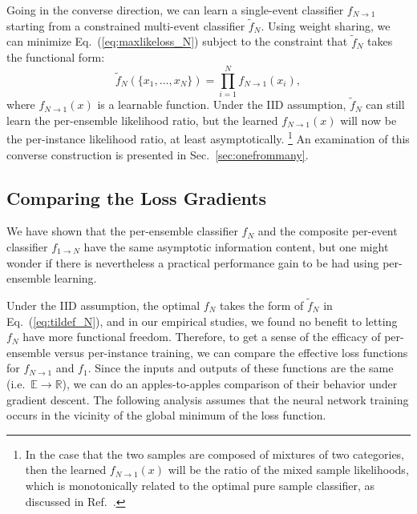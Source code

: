 \documentclass[aps,prx,reprint,preprintnumbers,superscriptaddress,nofootinbib,longbibliography,floatfix]{revtex4-2}
\DeclareRobustCommand{\Sec}[1]{Sec.~\ref{sec:#1}}
\DeclareRobustCommand{\Eq}[1]{Eq.~(\ref{eq:#1})}
\DeclareRobustCommand{\Ref}[1]{Ref.~\cite{#1}}
\begin{document}
Going in the converse direction, we can learn a single-event classifier $f_{N \to 1}$ starting from a constrained multi-event classifier $\tilde{f}_N$.
%
Using weight sharing, we can minimize \Eq{maxlikeloss_N} subject to the constraint that $\tilde{f}_N$ takes the functional form:
%
\begin{equation}
\label{eq:tildef_N}
\tilde{f}_N(\{x_1, \dots, x_N\}) = \prod_{i = 1}^N f_{N \to 1}(x_i),
\end{equation}
%
where $f_{N \to 1}(x)$ is a learnable function.
%
Under the IID assumption, $\tilde{f}_N$ can still learn the per-ensemble likelihood ratio, but the learned $f_{N \to 1}(x)$ will now be the per-instance likelihood ratio, at least asymptotically.%
%
\footnote{In the case that the two samples are composed of mixtures of two categories, then the learned $f_{N \to 1}(x)$ will be the ratio of the mixed sample likelihoods, which is monotonically related to the optimal pure sample classifier, as discussed in \Ref{Metodiev:2017vrx}.}
%
An examination of this converse construction is presented in \Sec{onefrommany}.


\subsection{Comparing the Loss Gradients}
\label{sec:gradients}

We have shown that the per-ensemble classifier $f_N$ and the composite per-event classifier $f_{1 \to N}$ have the same asymptotic information content, but one might wonder if there is nevertheless a practical performance gain to be had using per-ensemble learning.

Under the IID assumption, the optimal $f_N$ takes the form of $\tilde{f}_N$ in \Eq{tildef_N}, and in our empirical studies, we found no benefit to letting $f_N$ have more functional freedom.
%
Therefore, to get a sense of the efficacy of per-ensemble versus per-instance training, we can compare the effective loss functions for $f_{N \to 1}$ and $f_1$.
%
Since the inputs and outputs of these functions are the same (i.e.\ $\mathbb{E} \to \mathbb{R}$), we can do an apples-to-apples comparison of their behavior under gradient descent.
%
The following analysis assumes that the neural network training occurs in the vicinity of the global minimum of the loss function.
\end{document}
